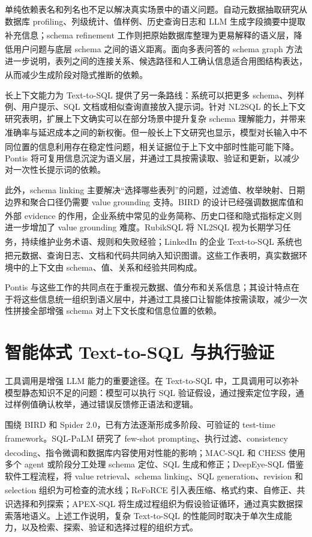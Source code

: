 \documentclass[
    bachelor,
    pdflinks,
]{xjtuthesis}
\newcommand{\upcite}[1]{\textsuperscript{\cite{#1}}}
\begin{document}
单纯依赖表名和列名也不足以解决真实场景中的语义问题。自动元数据抽取研究从数据库 profiling、列级统计、值样例、历史查询日志和 LLM 生成字段摘要中提取补充信息\upcite{shkapenyuk2025metadata}；schema refinement 工作则把原始数据库整理为更易解释的语义层，降低用户问题与底层 schema 之间的语义距离\upcite{rissaki2024schemaRefinement}。面向多表问答的 schema graph 方法进一步说明，表列之间的连接关系、候选路径和人工确认信息适合用图结构表达，从而减少生成阶段对隐式推断的依赖\upcite{wang2025schemaGraphQA}。

长上下文能力为 Text-to-SQL 提供了另一条路线：系统可以把更多 schema、列样例、用户提示、SQL 文档或相似查询直接放入提示词。针对 NL2SQL 的长上下文研究表明，扩展上下文确实可以在部分场景中提升复杂 schema 理解能力，并带来准确率与延迟成本之间的新权衡\upcite{chung2025longContextNL2SQL}。但一般长上下文研究也显示，模型对长输入中不同位置的信息利用存在稳定性问题，相关证据位于上下文中部时性能可能下降\upcite{liu2024lostMiddle}。Pontis 将可复用信息沉淀为语义层，并通过工具按需读取、验证和更新，以减少对一次性长提示词的依赖。

此外，schema linking 主要解决“选择哪些表列”的问题，过滤值、枚举映射、日期边界和聚合口径仍需要 value grounding 支持。BIRD 的设计已经强调数据库值和外部 evidence 的作用\upcite{li2023bird}，企业系统中常见的业务简称、历史口径和隐式指标定义则进一步增加了 value grounding 难度。RubikSQL 将 NL2SQL 视为长期学习任务，持续维护业务术语、规则和失败经验\upcite{chen2025rubiksql}；LinkedIn 的企业 Text-to-SQL 系统也把元数据、查询日志、文档和代码共同纳入知识图谱\upcite{chen2025enterpriseTextToSQL}。这些工作表明，真实数据环境中的上下文由 schema、值、关系和经验共同构成。

Pontis 与这些工作的共同点在于重视元数据、值分布和关系信息；其设计特点在于将这些信息统一组织到语义层中，并通过工具接口让智能体按需读取，减少一次性拼接全部增强 schema 对上下文长度和信息位置的依赖。

\section{智能体式 Text-to-SQL 与执行验证}

工具调用是增强 LLM 能力的重要途径。在 Text-to-SQL 中，工具调用可以弥补模型静态知识不足的问题：模型可以执行 SQL 验证假设，通过搜索定位字段，通过样例值确认枚举，通过错误反馈修正语法和逻辑。

围绕 BIRD 和 Spider 2.0，已有方法逐渐形成多阶段、可验证的 test-time framework。SQL-PaLM\upcite{sun2024sqlpalm} 研究了 few-shot prompting、执行过滤、consistency decoding、指令微调和数据库内容使用对性能的影响；MAC-SQL\upcite{wang2025macsql} 和 CHESS\upcite{talaei2024chess} 使用多个 agent 或阶段分工处理 schema 定位、SQL 生成和修正；DeepEye-SQL 借鉴软件工程流程，将 value retrieval、schema linking、SQL generation、revision 和 selection 组织为可检查的流水线\upcite{li2025deepeyesql}；ReFoRCE\upcite{deng2025reforce} 引入表压缩、格式约束、自修正、共识选择和列探索；APEX-SQL\upcite{cao2026apexsql} 将生成过程组织为假设验证循环，通过真实数据探索落地语义。上述工作说明，复杂 Text-to-SQL 的性能同时取决于单次生成能力，以及检索、探索、验证和选择过程的组织方式。
\end{document}
